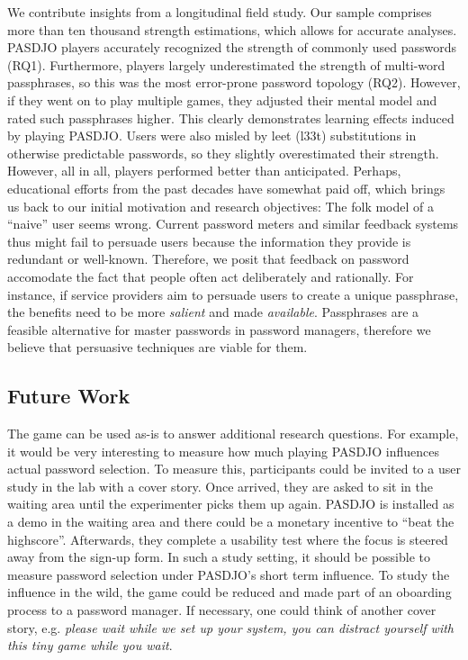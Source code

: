 We contribute insights from a longitudinal field study. Our sample comprises more than ten thousand strength estimations, which allows for accurate analyses. PASDJO players accurately recognized the strength of commonly used passwords (RQ1). Furthermore, players largely underestimated the strength of multi-word passphrases, so this was the most error-prone password topology (RQ2). However, if they went on to play multiple games, they adjusted their mental model and rated such passphrases higher. This clearly demonstrates learning effects induced by playing PASDJO. Users were also misled by leet (l33t) substitutions in otherwise predictable passwords, so they slightly overestimated their strength. However, all in all, players performed better than anticipated. Perhaps, educational efforts from the past decades have somewhat paid off, which brings us back to our initial motivation and research objectives: The folk model of a ``naive'' user seems wrong. Current password meters and similar feedback systems thus might fail to persuade users because the information they provide is redundant or well-known. Therefore, we posit that feedback on password accomodate the fact that people often act deliberately and rationally. For instance, if service providers aim to persuade users to create a unique passphrase, the benefits need to be more \textit{salient} and made \textit{available}. Passphrases are a feasible alternative for master passwords in password managers, therefore we believe that persuasive techniques are viable for them. 

\subsection{Future Work}
The game can be used as-is to answer additional research questions. For example, it would be very interesting to measure how much playing PASDJO influences actual password selection. To measure this, participants could be invited to a user study in the lab with a cover story. Once arrived, they are asked to sit in the waiting area until the experimenter picks them up again. PASDJO is installed as a demo in the waiting area and there could be a monetary incentive to ``beat the highscore''. Afterwards, they complete a usability test where the focus is steered away from the sign-up form. In such a study setting, it should be possible to measure password selection under PASDJO's short term influence. To study the influence in the wild, the game could be reduced and made part of an oboarding process to a password manager. If necessary, one could think of another cover story, e.g. \textit{please wait while we set up your system, you can distract yourself with this tiny game while you wait}.

